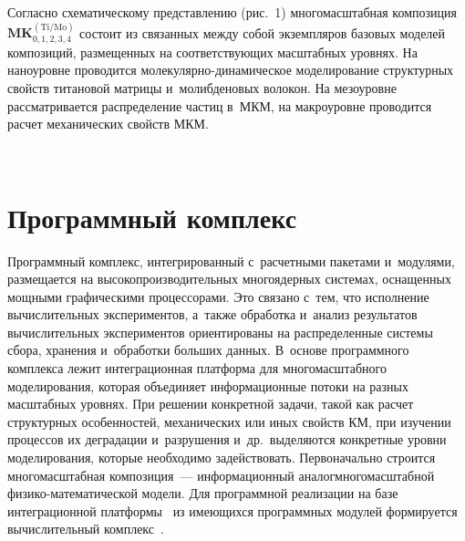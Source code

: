 \begin{multicols}{2}
     Согласно схематическому пред\-став\-ле\-нию (рис.~1) многомасштабная 
композиция $\mathbf{MK}_{0,1,2,3,4}^{(\mathrm{Ti/Mo})}$ со\-сто\-ит из связанных между 
собой экземпляров базовых моделей композиций, размещенных на 
со\-от\-вет\-ст\-ву\-ющих мас\-штаб\-ных уровнях. На наноуровне проводится  
мо\-ле\-ку\-ляр\-но-ди\-на\-ми\-че\-ское моделирование структурных свойств 
титановой мат\-ри\-цы и~молибденовых волокон. На мезоуровне рас\-смат\-ри\-ва\-ет\-ся 
распределение час\-тиц в~МКМ, на мак\-ро\-уров\-не проводится расчет механических 
свойств МКМ.

\setcounter{figure}{2}
\begin{figure*}[b] %
\vspace*{-6pt}
  \begin{center}  
    \mbox{%
\epsfxsize=120.383mm
}

\end{center}
\vspace*{-9pt}
\end{figure*}
     
\vspace*{-10pt}

\section{Программный комплекс}

\vspace*{-2pt}

   Программный комплекс, интегрированный с~расчетными пакетами 
и~модулями, размещается на высокопроизводительных многоядерных сис\-те\-мах, 
оснащенных мощными графическими процессорами. Это связано с~тем, что 
исполнение вычислительных экспериментов, а~так\-же обработка 
и~анализ результатов вы\-чис\-ли\-тель\-ных  экспериментов
 ориентированы на 
распределенные сис\-те\-мы сбора, хранения и~обработки больших данных. В~основе 
программного комплекса лежит интеграционная платформа для 
многомасштабного моделирования, которая объединяет информационные потоки 
на разных мас\-штаб\-ных уровнях. При решении конкретной задачи, такой как 
расчет структурных особенностей, механических или иных свойств 
КМ, при изучении процессов их де\-гра\-да\-ции 
и~разрушения и~др.\ выделяются конкретные уров\-ни моделирования, которые 
необходимо задействовать. Первоначально строится многомасштабная 
композиция~--- информационный аналог\linebreak мно\-го\-мас\-штаб\-ной  
фи\-зи\-ко-ма\-те\-ма\-ти\-че\-ской модели. Для программной реализации на базе 
интеграционной платформы~\cite{4-ab} из име\-ющих\-ся программных модулей 
формируется вы\-чис\-ли\-тель\-ный \mbox{комплекс}~\cite{5-ab, 6-ab}.
   

\end{multicols}
